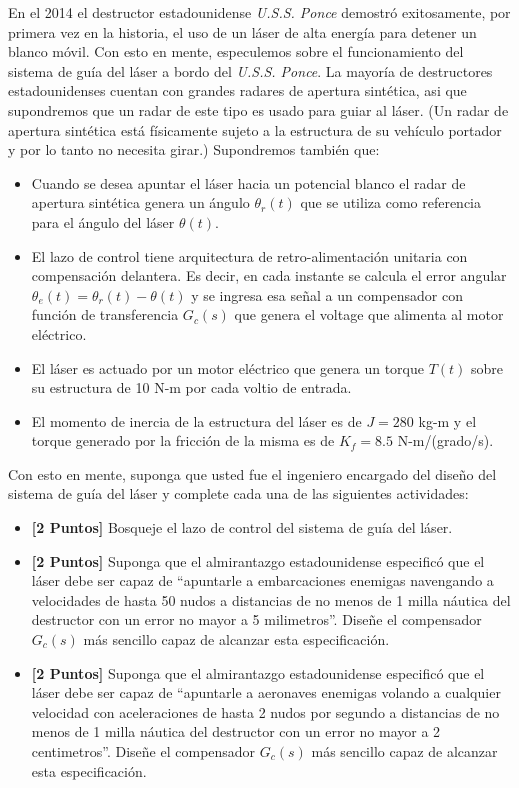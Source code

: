 \documentclass[ a4paper, twoside, 11pt]{article}
\begin{document}
\begin{problem}
En el 2014 el destructor estadounidense \emph{U.S.S. Ponce} demostr\'o exitosamente, por primera vez en la historia, el uso de un l\'aser de alta energ\'ia para detener un blanco m\'ovil. Con esto en mente, especulemos sobre el funcionamiento del sistema de gu\'ia del l\'aser a bordo del \emph{U.S.S. Ponce}. La mayor\'ia de destructores estadounidenses cuentan con grandes radares de apertura sint\'etica, asi que supondremos que un radar de este tipo es usado para guiar al l\'aser. (Un radar de apertura sint\'etica est\'a f\'isicamente sujeto a la estructura de su veh\'iculo portador y por lo tanto no necesita girar.) Supondremos tambi\'en que: 
\begin{itemize}
\item Cuando se desea apuntar el l\'aser hacia un potencial blanco el radar de apertura sint\'etica genera un \'angulo $\theta_r(t)$ que se utiliza como referencia para el \'angulo del l\'aser $\theta(t)$. 
\item El lazo de control tiene arquitectura de retro-alimentaci\'on unitaria con compensaci\'on delantera. Es decir, en cada instante se calcula el error angular $\theta_e(t) = \theta_r(t) - \theta(t)$ y se ingresa esa se\~nal a un compensador con funci\'on de transferencia $G_c(s)$ que genera el voltage que alimenta al motor el\'ectrico. 
\item El l\'aser es actuado por un motor el\'ectrico que genera un torque $T(t)$ sobre su estructura de 10 N-m por cada voltio de entrada. 
\item El momento de inercia de la estructura del l\'aser es de $J = 280$ kg-m y el torque generado por la fricci\'on de la misma es de $K_f = 8.5$ N-m/(grado/s). 
\end{itemize}

Con esto en mente, suponga que usted fue el ingeniero encargado del dise\~no del sistema de gu\'ia del l\'aser y complete cada una de las siguientes actividades: 
\begin{itemize}
\item \textbf{[2 Puntos]} Bosqueje el lazo de control del sistema de gu\'ia del l\'aser. 
\item \textbf{[2 Puntos]} Suponga que el almirantazgo estadounidense especific\'o que el l\'aser debe ser capaz de ``apuntarle a embarcaciones enemigas navengando a velocidades de hasta 50 nudos a distancias de no menos de 1 milla n\'autica del destructor con un error no mayor a 5 milimetros''. Dise\~ne el compensador $G_c(s)$ m\'as sencillo capaz de alcanzar esta especificaci\'on. 
\item \textbf{[2 Puntos]} Suponga que el almirantazgo estadounidense especific\'o que el l\'aser debe ser capaz de ``apuntarle a aeronaves enemigas volando a cualquier velocidad con aceleraciones de hasta 2 nudos por segundo a distancias de no menos de 1 milla n\'autica del destructor con un error no mayor a 2 centimetros''. Dise\~ne el compensador $G_c(s)$ m\'as sencillo capaz de alcanzar esta especificaci\'on. 
\end{itemize}

\end{problem}
\vspace{\baselineskip}
\end{document}
